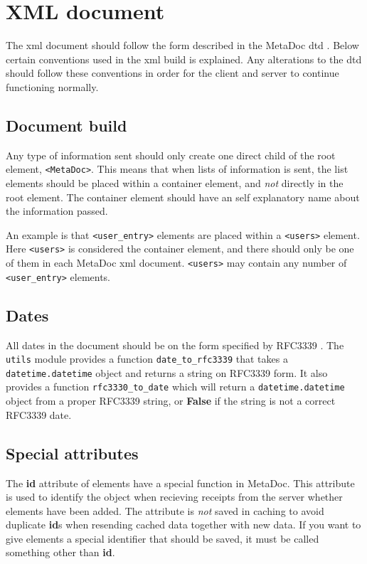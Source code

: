 \newpage
\section{XML document}
\label{sec:xmldoc}
The \gls{xml} document should follow the form described in the MetaDoc
\gls{dtd} \cite{metadoc_dtd}. Below certain conventions used in the \gls{xml}
build is explained. Any alterations to the \gls{dtd} should follow these
conventions in order for the client and server to continue functioning
normally. 

\subsection{Document build}
Any type of information sent should only create one direct child of the root
element, \texttt{<MetaDoc>}. This means that when lists of information is sent,
the list elements should be placed within a container element, and \textit{not}
directly in the root element. The container element should have an self
explanatory name about the information passed. 

An example is that \texttt{<user\_entry>} elements are placed within a
\texttt{<users>} element. Here \texttt{<users>} is considered the container
element, and there should only be one of them in each MetaDoc \gls{xml}
document.  \texttt{<users>} may contain any number of \texttt{<user\_entry>}
elements. 

\subsection{Dates}
All dates in the document should be on the form specified by RFC3339
\cite{rfc3339}. The \texttt{utils} module provides a function
\texttt{date\_to\_rfc3339} that takes a \texttt{datetime.datetime} object and
returns a string on RFC3339 form. It also provides a function
\texttt{rfc3330\_to\_date} which will return a \texttt{datetime.datetime}
object from a proper RFC3339 string, or \textbf{False} if the string is not a
correct RFC3339 date.

\subsection{Special attributes}
The \textbf{id} attribute of elements have a special function in MetaDoc. This
attribute is used to identify the object when recieving receipts from the
server whether elements have been added. The attribute is \textit{not} saved in
caching to avoid duplicate \textbf{id}s when resending cached data together
with new data. If you want to give elements a special identifier that should be
saved, it must be called something other than \textbf{id}.
